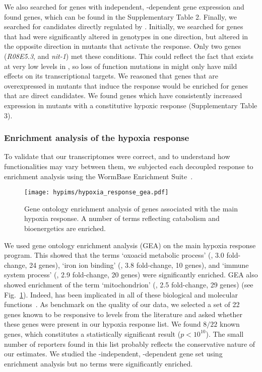 We also searched for genes with  independent, -dependent gene
expression and found \vhltargets{} genes, which can be found in the Supplementary
Table 2.
Finally, we searched for candidates directly regulated by . Initially, we
searched for genes that had were significantly altered in \hif{} genotypes in one
direction, but altered in the opposite direction in mutants that activate the
\hifp{} response. Only two genes (\emph{R08E5.3}, and \emph{nit-1}) met these
conditions. This could reflect the fact that \hifp{} exists at very low
levels in \cel{}, so loss of function mutations in  might only have
mild effects on its transcriptional targets. We reasoned that genes
that are overexpressed in mutants that induce the \hifp{} response would be enriched
for genes that are direct candidates.  We found \hiftargets{}  genes which have
consistently increased expression in mutants with a constitutive hypoxic response
(Supplementary Table 3).


\subsubsection*{Enrichment analysis of the hypoxia response}
\label{sub:ea_hypoxia}
To validate that our transcriptomes were correct, and to understand how
functionalities may vary between them, we subjected each decoupled response to
enrichment analysis using the WormBase Enrichment Suite~\citep{Angeles-Albores2016,
Angeles-Albores2016b}.

\begin{figure}[tbhp]
\centering
\texttt{[image: hypims/hypoxia\_response\_gea.pdf]}
\caption{
Gene ontology enrichment analysis of genes associated with the main hypoxia response.
A number of terms reflecting catabolism and bioenergetics are enriched.
}
\label{fig:hyp_gea}
\end{figure}

We used gene ontology enrichment analysis (GEA) on the main hypoxia response program.
This showed that the terms `oxoacid metabolic process' (, 3.0 fold-change,
24 genes), `iron ion binding' (, 3.8 fold-change, 10 genes), and `immune
system process' (, 2.9 fold-change, 20 genes) were significantly enriched.
GEA also showed enrichment of the term `mitochondrion' (, 2.5 fold-change,
29 genes) (see Fig.~\ref{fig:hyp_gea}). Indeed, \hif{} has been implicated in
all of these biological and molecular functions~\citep{Luhachack2012,Ackerman2012,
Romney2011,Semenza2011}.
As benchmark on the quality of our data, we selected a set of 22 genes known to
be responsive to \hifp{} levels from the literature and asked whether these genes
were present in our hypoxia response list. We found $8/22$ known genes, which
constitutes a statistically significant result ($p<10^{10}$). The small number of
reporters found in this list probably reflects the conservative nature of our
estimates.
We studied the -independent, -dependent gene set
using enrichment analysis but no terms were significantly enriched.

